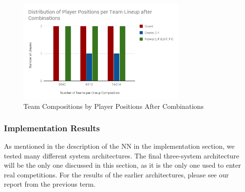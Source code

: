 \begin{figure}[ht]
    \centering
    \includegraphics[width=0.75\textwidth]{figures/distributionAfterCombination}
    \caption{Team Compositions by Player Positions After Combinations}
    \label{fig:distributionAfterCombination}
\end{figure}

\subsubsection{Implementation Results}
As mentioned in the description of the NN in the implementation section, we tested many different system architectures. The final three-system architecture will be the only one discussed in this section, as it is the only one used to enter real competitions. For the results of the earlier architectures, please see our report from the previous term.

